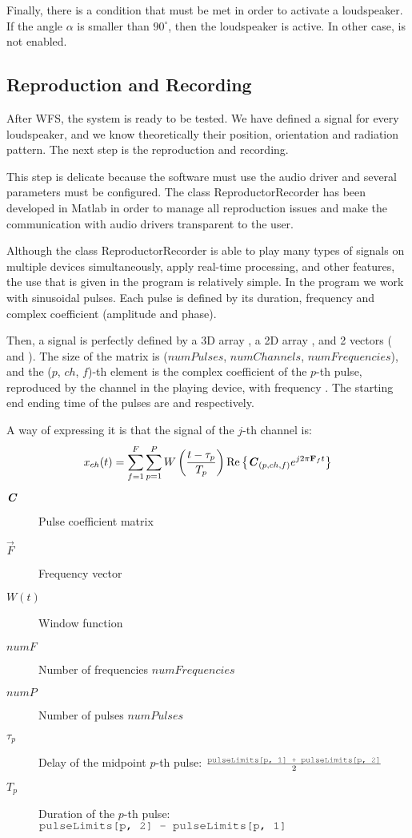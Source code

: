 Finally, there is a condition that must be met in order to activate a loudspeaker. If the angle $\alpha$ is smaller than $90^\circ$, then the loudspeaker is active. In other case, is not enabled.

\subsection{Reproduction and Recording}
After WFS, the system is ready to be tested. We have defined a signal for every loudspeaker, and we know theoretically their position, orientation and radiation pattern. The next step is the reproduction and recording.

This step is delicate because the software must use the audio driver and several parameters must be configured. The class ReproductorRecorder has been developed in Matlab in order to manage all reproduction issues and make the communication with audio drivers transparent to the user.

Although the class ReproductorRecorder is able to play many types of signals on multiple devices simultaneously, apply real-time processing, and other features, the use that is given in the program is relatively simple. In the program we work with sinusoidal pulses. Each pulse is defined by its duration, frequency and complex coefficient (amplitude and phase).

Then, a signal is perfectly defined by a 3D array , a 2D array , and 2 vectors ( and ). The size of the matrix is ($numPulses$, $numChannels$, $numFrequencies$), and the ($p$, $ch$, $f$)-th element is the complex coefficient of the $p$-th pulse, reproduced by the  channel in the playing device, with frequency . The starting end ending time of the pulses are  and  respectively.

A way of expressing it is that the signal of the $j$-th channel is:
\begin{equation}
x_{ch}(t) = \sum_{f = 1}^{F} \sum_{p = 1}^{P} W\left(\frac{t - \tau_p}{T_p}\right)
\Re \left\{ \bm{\mathit{C}}_{(p,ch,f)} e^{j 2 \pi \mathbf{F}_f t} \right\}
\end{equation}

\begin{description}
	\item[$\bm{\mathit{C}}$] Pulse coefficient matrix 
	\item[$\vec{F}$] Frequency vector 
	\item[$W(t)$] Window function
	\item[$numF$] Number of frequencies $numFrequencies$
	\item[$numP$] Number of pulses $numPulses$
	\item[$\tau_p$] Delay of the midpoint $p$-th pulse: $\frac{\text{\variable{pulseLimits[p, 1] + pulseLimits[p, 2]}}}{2}$
	\item[$T_p$] Duration of the $p$-th pulse: $\text{\variable{pulseLimits[p, 2] - pulseLimits[p, 1]}}$
\end{description}

